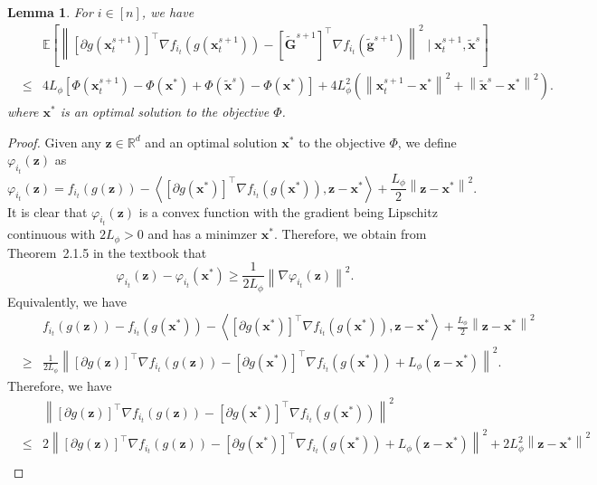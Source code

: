 \documentclass[11pt]{article}
\newtheorem{lemma}[theorem]{Lemma}
\newcommand{\BE}{\mathbb{E}}
\newcommand{\x}{\mathbf x}
\newcommand{\z}{\mathbf z}
\newcommand{\g}{\mathbf g}
\newcommand{\G}{\mathbf G}
\newcommand{\br}{\mathbb{R}}
\begin{document}
\begin{lemma}\label{Lemma:Gradient-Objective}
For $i\in\left[n\right]$, we have
\begin{eqnarray*}
& & \BE\left[\left\| \left[\partial g(\x_t^{s+1})\right]^\top\nabla f_{i_t}(g(\x_t^{s+1})) - \left[\tilde{\G}^{s+1}\right]^\top \nabla f_{i_t}(\tilde{\g}^{s+1})\right\|^2 \mid \x_t^{s+1}, \tilde{\x}^s\right] \\
& \leq & 4L_\phi\left[\Phi(\x_t^{s+1}) - \Phi(\x^*) + \Phi(\tilde{\x}^s) - \Phi(\x^*)\right] + 4L_\phi^2 \left(\left\|\x_t^{s+1}-\x^*\right\|^2 + \left\|\tilde{\x}^s-\x^*\right\|^2\right).
\end{eqnarray*}
where $\x^*$ is an optimal solution to the objective $\Phi$. 
\end{lemma}
\begin{proof}
Given any $\z\in\br^d$ and an optimal solution $\x^*$ to the objective $\Phi$, we define $\varphi_{i_t}(\z)$ as
\begin{equation*}
\varphi_{i_t}(\z) = f_{i_t}(g(\z)) - \left\langle\left[\partial g(\x^*)\right]^\top\nabla f_{i_t}(g(\x^*)), \z-\x^*\right\rangle + \frac{L_\phi}{2}\left\|\z-\x^*\right\|^2. 
\end{equation*}
It is clear that $\varphi_{i_t}(\z)$ is a convex function with the gradient being Lipschitz continuous with $2L_\phi>0$ and has a minimzer $\x^*$. Therefore, we obtain from Theorem~2.1.5 in the textbook \cite{Nesterov-2013-Introductory} that  
\begin{equation*}
\varphi_{i_t}(\z)  - \varphi_{i_t}(\x^*) \geq \frac{1}{2L_\phi}\left\| \nabla \varphi_{i_t}(\z) \right\|^2. 
\end{equation*}
Equivalently, we have
\begin{eqnarray} \label{Lemma:Gradient-Objective-Inequality-1}
& & f_{i_t}(g(\z)) - f_{i_t}(g(\x^*)) - \left\langle\left[\partial g(\x^*)\right]^\top\nabla f_{i_t}(g(\x^*)), \z-\x^*\right\rangle + \frac{L_\phi}{2}\left\|\z-\x^*\right\|^2 \nonumber \\
& \geq & \frac{1}{2L_\phi}\left\| \left[\partial g(\z)\right]^\top\nabla f_{i_t}(g(\z)) - \left[\partial g(\x^*)\right]^\top\nabla f_{i_t}(g(\x^*)) + L_\phi\left(\z-\x^*\right)\right\|^2. 
\end{eqnarray}
Therefore, we have
\begin{eqnarray*}
& & \left\| \left[\partial g(\z)\right]^\top\nabla f_{i_t}(g(\z)) - \left[\partial g(\x^*)\right]^\top\nabla f_{i_t}(g(\x^*)) \right\|^2 \\
& \leq & 2\left\| \left[\partial g(\z)\right]^\top\nabla f_{i_t}(g(\z)) - \left[\partial g(\x^*)\right]^\top\nabla f_{i_t}(g(\x^*)) + L_\phi\left(\z-\x^*\right)\right\|^2 + 2L_\phi^2\left\|\z-\x^*\right\|^2 \\

\end{eqnarray*}
\end{proof}
\end{document}
